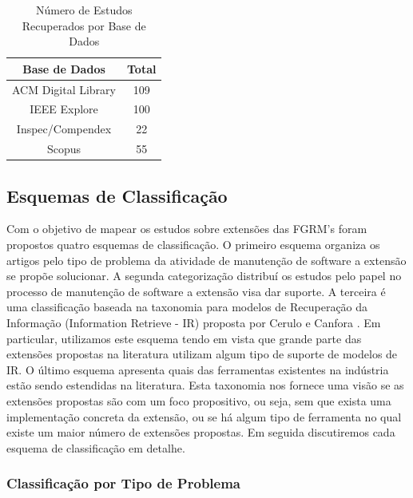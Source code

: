 \begin{table}[htb]
	\centering
	\caption{Número de Estudos Recuperados por Base de Dados}
	\label{tab:estudos-por-base-dados}
	\begin{tabular}{cc}
		\hline
		\textbf{Base de Dados} & \textbf{Total} \\ \hline
		ACM Digital Library    & 109            \\
		IEEE Explore           & 100            \\
		Inspec/Compendex       & 22             \\
		Scopus                 & 55             \\ \hline
	\end{tabular}

\end{table}

\subsection{Esquemas de Classificação}
\label{subsec:map-esquemas-classificacao}

Com o objetivo de mapear os estudos sobre extensões das FGRM's foram propostos quatro esquemas de classificação. O primeiro esquema organiza os artigos pelo tipo de problema da atividade de manutenção de software a extensão se propõe solucionar. A segunda categorização distribuí os estudos pelo papel no processo de manutenção de software a extensão visa dar suporte. A terceira é uma classificação baseada na taxonomia para modelos de Recuperação da Informação (Information Retrieve - IR) proposta por Cerulo e Canfora \cite{cerulo2004taxonomy}. Em particular, utilizamos este esquema tendo em vista que grande parte das extensões propostas na literatura utilizam algum tipo de suporte de modelos de IR. O último esquema apresenta quais das ferramentas existentes na indústria estão sendo estendidas na literatura. Esta taxonomia nos fornece uma visão se as extensões propostas são com um foco propositivo, ou seja, sem que exista uma implementação concreta da extensão, ou se há algum tipo de ferramenta no qual existe um maior número de extensões propostas. Em seguida discutiremos cada esquema de classificação em detalhe.

\subsubsection{Classificação por Tipo de Problema}
\label{subsubsec:map-esquema-suporte-problema}

